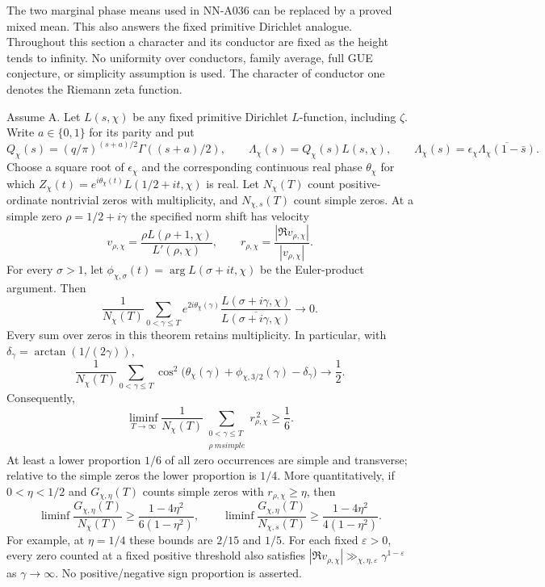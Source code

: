 The two marginal phase means used in NN-A036 can be replaced by a
proved mixed mean. This also answers the fixed primitive Dirichlet
analogue. Throughout this section a character and its conductor are
fixed as the height tends to infinity. No uniformity over conductors,
family average, full GUE conjecture, or simplicity assumption is used.
The character of conductor one denotes the Riemann zeta function.

\begin{theorem}
Assume A. Let $L(s,\chi)$ be any fixed primitive Dirichlet $L$-function,
including $\zeta$. Write $a\in\{0,1\}$ for its parity and put
\[
 Q_\chi(s)=(q/\pi)^{(s+a)/2}\Gamma((s+a)/2),\qquad
 \Lambda_\chi(s)=Q_\chi(s)L(s,\chi),\qquad
 \Lambda_\chi(s)=\epsilon_\chi\overline{\Lambda_\chi(1-\bar s)}.
\]
Choose a square root of $\epsilon_\chi$ and the corresponding continuous
real phase $\theta_\chi$ for which
$Z_\chi(t)=e^{i\theta_\chi(t)}L(1/2+it,\chi)$ is real. Let
$N_\chi(T)$ count positive-ordinate nontrivial zeros with multiplicity,
and $N_{\chi,s}(T)$ count simple zeros. At a simple zero $\rho=1/2+i\gamma$
the specified norm shift has velocity
\[
 v_{\rho,\chi}=
 \frac{\rho L(\rho+1,\chi)}{L'(\rho,\chi)},\qquad
 r_{\rho,\chi}=\frac{|\Re v_{\rho,\chi}|}{|v_{\rho,\chi}|}.
\]
For every $\sigma>1$, let
$\phi_{\chi,\sigma}(t)=\arg L(\sigma+it,\chi)$ be the Euler-product
argument. Then
\begin{equation}\label{eq:A037-joint}
 \frac1{N_\chi(T)}\sum_{0<\gamma\le T}
 e^{2i\theta_\chi(\gamma)}
 \frac{L(\sigma+i\gamma,\chi)}
      {\overline{L(\sigma+i\gamma,\chi)}}\longrightarrow0.
\end{equation}
Every sum over zeros in this theorem retains multiplicity. In particular,
with $\delta_\gamma=\arctan(1/(2\gamma))$,
\begin{equation}\label{eq:A037-second}
 \frac1{N_\chi(T)}\sum_{0<\gamma\le T}
 \cos^2\bigl(\theta_\chi(\gamma)+
              \phi_{\chi,3/2}(\gamma)-\delta_\gamma\bigr)
 \longrightarrow\frac12.
\end{equation}
Consequently,
\[
 \liminf_{T\to\infty}\frac1{N_\chi(T)}
 \sum_{\substack{0<\gamma\le T\\\rho\ {
m simple}}}
 r_{\rho,\chi}^{\,2}\ge\frac16.
\]
At least a lower proportion $1/6$ of all zero occurrences are simple
and transverse; relative to the simple zeros the lower proportion is
$1/4$. More quantitatively, if $0<\eta<1/2$ and $G_{\chi,\eta}(T)$
counts simple zeros with $r_{\rho,\chi}\ge\eta$, then
\begin{equation}\label{eq:A037-counts}
 \liminf\frac{G_{\chi,\eta}(T)}{N_\chi(T)}
 \ge\frac{1-4\eta^2}{6(1-\eta^2)},\qquad
 \liminf\frac{G_{\chi,\eta}(T)}{N_{\chi,s}(T)}
 \ge\frac{1-4\eta^2}{4(1-\eta^2)}.
\end{equation}
For example, at $\eta=1/4$ these bounds are $2/15$ and $1/5$.
For each fixed $\varepsilon>0$, every zero counted at a fixed positive
threshold also satisfies
$|\Re v_{\rho,\chi}|\gg_{\chi,\eta,\varepsilon}
\gamma^{1-\varepsilon}$ as $\gamma\to\infty$.
No positive/negative sign proportion is asserted.
\end{theorem}

